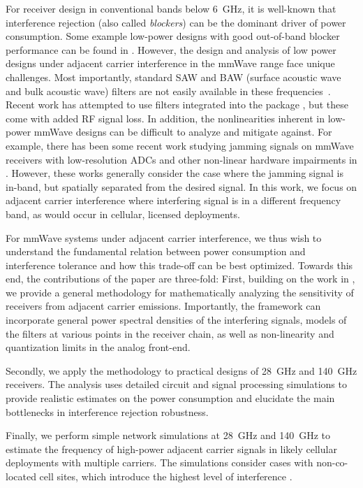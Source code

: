 For receiver design in conventional bands below \SI{6}{GHz},
it is well-known that interference rejection 
(also called \emph{blockers}) 
can be the dominant
driver of power consumption.
Some example low-power designs with good
out-of-band
blocker performance can be found in
\cite{sepidband2018cmos,trotskovsky20180,agrawal2018interferer}.
However, the design and analysis of 
low power designs under adjacent carrier
interference in the mmWave
range face unique challenges. 
Most importantly, standard
SAW and BAW (surface acoustic wave and bulk
acoustic wave) filters are not easily available in
these frequencies~\cite{mahon20175g}.
Recent work has attempted to use filters integrated into the package
\cite{watanabe2020review,siddiqui2021dual,gu2021antenna}, but these come
with added RF signal loss.  In addition, the nonlinearities inherent
in low-power mmWave designs can be difficult
to analyze and mitigate against.
For example, there has been some recent work
studying jamming signals on 
mmWave receivers with low-resolution ADCs
and other non-linear hardware impairments in
\cite{akhlaghpasand2020jamming,pirzadeh2019mitigation,marti2021hybrid,jacobsson2018massive}.
However, these works generally consider the case
where the jamming signal is in-band,
but spatially separated 
from the desired signal.  In this work,
we focus on adjacent carrier interference
where interfering signal is in a different
frequency band, as would occur in cellular,
licensed deployments.

For mmWave systems under adjacent
carrier interference, we thus wish to understand
the fundamental relation between power 
consumption and interference tolerance
and how this trade-off can be best optimized.
Towards this end, 
the contributions of the paper are three-fold:
First,  building on the work in
\cite{dutta2020capacity,skrimponis2020power,skrimponis2021towards,skrimponis2020efficient},
we provide a general methodology 
for mathematically analyzing the sensitivity of
receivers from adjacent carrier emissions.
Importantly, the framework can incorporate 
general power spectral densities of the interfering
signals, models
of the filters at various points in the receiver
chain, as well as non-linearity and quantization 
limits in the analog front-end.


Secondly, we apply the methodology to practical
designs
of \SI{28}{GHz} and \SI{140}{GHz} receivers.  
The analysis uses detailed circuit
and signal processing simulations to provide
realistic estimates on the power consumption
and elucidate the main bottlenecks in interference rejection
robustness.

Finally, we perform simple network simulations
at \SI{28}{GHz} and \SI{140}{GHz}
to estimate the frequency of high-power adjacent carrier
signals in likely cellular deployments with multiple carriers.
The simulations consider cases with non-co-located
cell sites,
which introduce the highest level of interference
\cite{rebato2017hybrid}.
